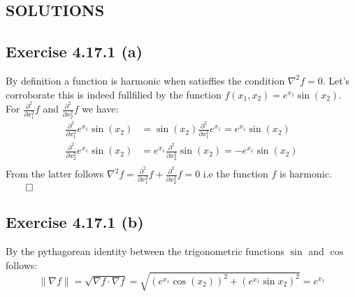 \documentclass{exam}
\renewenvironment{proof}{{\noindent\itshape\ignorespaces}}{{\hfill$\qed$\\}}
\begin{document}
\newpage

\begin{center}    
    \section*{SOLUTIONS}
\end{center}

\subsection*{Exercise 4.17.1 (a)}
    By definition a function is harmonic when satisffies the condition $\nabla^{2}f = 0$. Let's corroborate this is indeed fullfilied by the function 
    $f(x_1,x_2) = e^{x_1}\sin(x_2)$. For $\frac{\partial^{2}}{ \partial x^{2}_1}f$ and $\frac{\partial^{2}}{ \partial x^{2}_2}f$ we have:\\
    \begin{proof}
        \begin{equation*}     
            \begin{aligned}
                \frac{\partial^{2}}{ \partial x^{2}_1} e^{x_1}\sin(x_2) &=  \sin(x_2)\frac{\partial^{2}}{ \partial x^{2}_1} e^{x_1} = e^{x_1}\sin(x_2)\\
                \frac{\partial^{2}}{ \partial x^{2}_2} e^{x_1}\sin(x_2) &=  e^{x_1}\frac{\partial^{2}}{ \partial x^{2}_2}\sin(x_2)  = -e^{x_1}\sin(x_2)\\
            \end{aligned}
    \end{equation*}
    From the latter follows $\nabla^{2}f = \displaystyle\frac{\partial^{2}}{ \partial x^{2}_1}f + \displaystyle\frac{\partial^{2}}{ \partial x^{2}_2}f = 0$ i.e the function $f$ is harmonic.
    \end{proof}
\subsection*{Exercise 4.17.1 (b)}
By the pythagorean identity between the trigonometric functions $\sin$ and $\cos$ follows:\\
\begin{equation*}
    \lVert \nabla f \lVert = \sqrt{\nabla f \cdot \nabla f} = \sqrt{(e^{x_1}\cos(x_2))^{2} + (e^{x_1}\sin{x_2})^{2}} = e^{x_1}
\end{equation*}

\begin{comment}
    
    \subsection*{Exercise x.y.2 (a)}
    Et harum quidem rerum facilis est et expedita distinctio. Nam libero tempore, cum soluta nobis est 
    eligendi optio cumque nihil impedit quo minus id quod maxime placeat facere possimus, omnis voluptas assumenda est, 
    omnis dolor repellendus. 
    \begin{proof}
         a = a
    \end{proof}
\end{comment}
\end{document}
